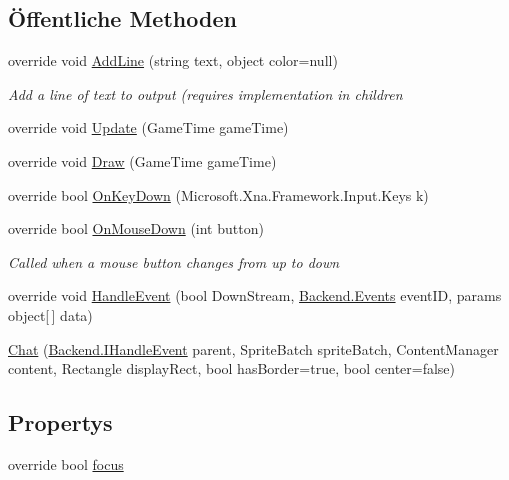 \subsection*{Öffentliche Methoden}
\begin{DoxyCompactItemize}
\item 
override void \hyperlink{class_gruppe22_1_1_client_1_1_chat_a4caef8eac20c6ac2094ca85de9ce2404}{Add\-Line} (string text, object color=null)
\begin{DoxyCompactList}\small\item\em Add a line of text to output (requires implementation in children \end{DoxyCompactList}\item 
override void \hyperlink{class_gruppe22_1_1_client_1_1_chat_a505f59e3352f8170506adf261b2c5091}{Update} (Game\-Time game\-Time)
\item 
override void \hyperlink{class_gruppe22_1_1_client_1_1_chat_a38eabd876d056f309733920d48529b8d}{Draw} (Game\-Time game\-Time)
\item 
override bool \hyperlink{class_gruppe22_1_1_client_1_1_chat_a262b6a8fbff282b5dc6a4608aec1bee7}{On\-Key\-Down} (Microsoft.\-Xna.\-Framework.\-Input.\-Keys k)
\item 
override bool \hyperlink{class_gruppe22_1_1_client_1_1_chat_aa5fdd87b71df060f018268a07dce5ed8}{On\-Mouse\-Down} (int button)
\begin{DoxyCompactList}\small\item\em Called when a mouse button changes from up to down \end{DoxyCompactList}\item 
override void \hyperlink{class_gruppe22_1_1_client_1_1_chat_a82d35f852f996141331bda83b17876ff}{Handle\-Event} (bool Down\-Stream, \hyperlink{namespace_gruppe22_1_1_backend_ab56df91bb0bdafa1ea978e552209ce73}{Backend.\-Events} event\-I\-D, params object\mbox{[}$\,$\mbox{]} data)
\item 
\hyperlink{class_gruppe22_1_1_client_1_1_chat_a826ffa624399278465040c080217495e}{Chat} (\hyperlink{interface_gruppe22_1_1_backend_1_1_i_handle_event}{Backend.\-I\-Handle\-Event} parent, Sprite\-Batch sprite\-Batch, Content\-Manager content, Rectangle display\-Rect, bool has\-Border=true, bool center=false)
\end{DoxyCompactItemize}
\subsection*{Propertys}
\begin{DoxyCompactItemize}
\item 
override bool \hyperlink{class_gruppe22_1_1_client_1_1_chat_a0d034dac8f50fa69a98c3e4a6c574150}{focus}
\end{DoxyCompactItemize}
